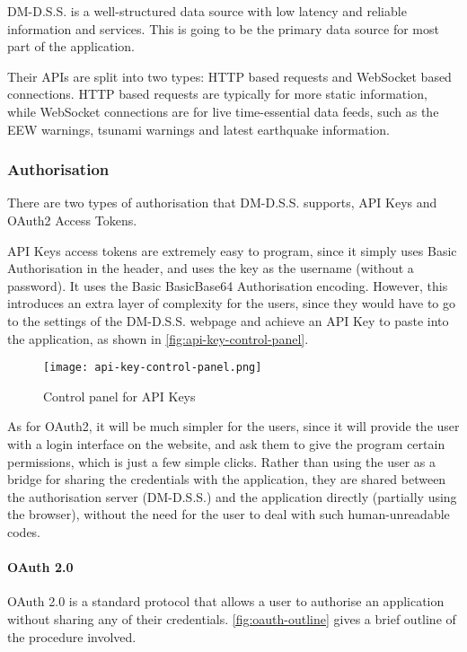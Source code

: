 DM-D.S.S. is a well-structured data source with low latency and reliable information and services. This is going to be the primary data source for most part of the application.

Their APIs are split into two types: HTTP based requests and WebSocket based connections. HTTP based requests are typically for more static information, while WebSocket connections are for live time-essential data feeds, such as the EEW warnings, tsunami warnings and latest earthquake information.

\subsubsection{Authorisation}

There are two types of authorisation that DM-D.S.S. supports, API Keys and OAuth2 Access Tokens.

API Keys access tokens are extremely easy to program, since it simply uses Basic Authorisation in the header, and uses the key as the username (without a password). It uses the Basic BasicBase64 Authorisation encoding. However, this introduces an extra layer of complexity for the users, since they would have to go to the settings of the DM-D.S.S. webpage and achieve an API Key to paste into the application, as shown in \autoref{fig:api-key-control-panel}.

\begin{figure}[htp]
    \centering
    \texttt{[image: api-key-control-panel.png]}
    \caption{Control panel for API Keys}
    \label{fig:api-key-control-panel}
\end{figure}

As for OAuth2, it will be much simpler for the users, since it will provide the user with a login interface on the website, and ask them to give the program certain permissions, which is just a few simple clicks. Rather than using the user as a bridge for sharing the credentials with the application, they are shared between the authorisation server (DM-D.S.S.) and the application directly (partially using the browser), without the need for the user to deal with such human-unreadable codes.

\paragraph{OAuth 2.0}

OAuth 2.0 is a standard protocol that allows a user to authorise an application without sharing any of their credentials. \autoref{fig:oauth-outline} gives a brief outline of the procedure involved.

